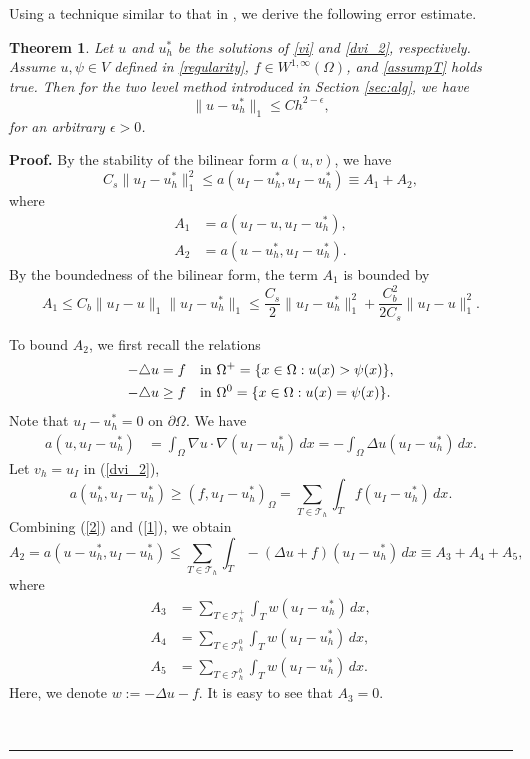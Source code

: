 \documentclass[12pt]{article}
\newtheorem{theorem}{Theorem}[section]
\newenvironment{proof}[1][Proof]{\textbf{#1.} }
{\ \rule{0.75em}{0.75em}\smallskip}
\begin{document}
Using a technique similar to that in \cite{wang02, wang10}, we derive the following error estimate.

\begin{theorem}\label{thm1qua}
Let $u$ and $u_h^*$ be the solutions of \eqref{vi} and \eqref{dvi_2}, respectively. 
{\color{red} Assume $u, \psi \in V$ defined in \eqref{regularity}, $f\in W^{1,\infty}(\Omega)$, 
and \eqref{assumpT} holds true.}  Then for the two level method introduced in Section \ref{sec:alg}, we have
\begin{equation} \label{errh}
\|u-u_h^*\|_1 \leq C h^{2-\epsilon},
\end{equation}
for an arbitrary $\epsilon>0$.
\end{theorem}
\begin{proof}
By the stability of the bilinear form $a(u,v)$, we have
\begin{equation}
C_s\|u_I-u_h^*\|_1^2 \le a(u_I-u_h^*,u_I-u_h^*)\equiv A_1+A_2, \label{err1qua}
\end{equation}
where
\begin{align*}
A_1 &= a(u_I-u,u_I-u_h^*),\\
A_2&= a(u-u_h^*,u_I-u_h^*).
\end{align*}
By the boundedness of the bilinear form, the term $A_1$ is bounded by
\begin{equation}
  A_1 \leq C_b\|u_I-u\|_1\|u_I-u_h^*\|_1
   \le \frac{C_s}{2}\|u_I-u_h^*\|_1^2
    +\frac{C_b^2}{2C_s}\|u_I-u\|_1^2.
\label{err2qua}
\end{equation}

To bound $A_2$, we first recall the relations
\begin{align*}
 -\triangle u&=f\quad {\rm in}\ \Omega^+=\{x\in\Omega:u(x)>\psi(x)\},\\
 -\triangle u &\geq f\quad {\rm in}\ \Omega^0 = \{x\in \Omega:u(x) = \psi(x)\}.
\end{align*}
Note that $u_I - u_h^*=0$ on $\partial\Omega$.  We have
\begin{align}\label{1}
a(u,u_I-u_h^*)&=\int_\Omega\nabla u\cdot\nabla(u_I-u_h^*)\,dx=-\int_\Omega \Delta u (u_I-u_h^*)\,dx.
\end{align}
Let $v_h = u_I$ in (\ref{dvi_2}),
\begin{equation}\label{2}
  a(u_h^*,u_I-u_h^*) \ge (f,u_I-u_h^*)_\Omega = \sum_{T\in \mathcal{T}_h}\int_T f
  (u_I-u_h^*)\, dx.
\end{equation}
Combining (\ref{2}) and (\ref{1}), we obtain
\begin{equation}\label{T2}
A_2=a(u-u_h^*,u_I-u_h^*) \le\sum_{T\in \mathcal{T}_h}\int_T -(\Delta u+ f)(u_I-u_h^*)\,dx
\equiv A_3+A_4+A_5, 
\end{equation}
where
\begin{align*}
A_3 &= \sum_{T\in \mathcal{T}_h^+}\int_T w(u_I-u_h^*)\, dx, \\
A_4 & = \sum_{T\in \mathcal{T}_h^0}\int_T w(u_I-u_h^*)\, dx, \\
A_5 & = \sum_{T\in \mathcal{T}_h^b}\int_T w(u_I-u_h^*)\, dx.
\end{align*}
Here, we denote $w:=-\Delta u - f$. It is easy to see that $A_3=0$.


\end{proof}
\end{document}
